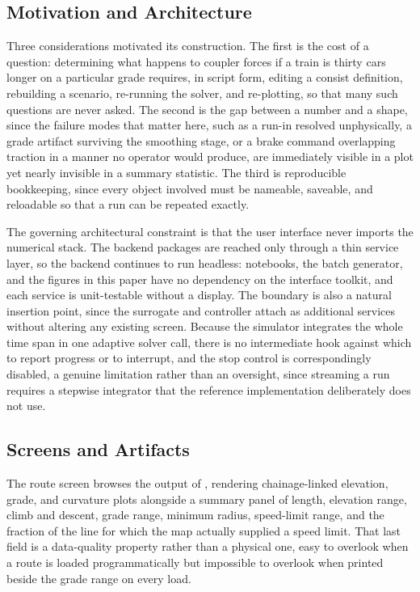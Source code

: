 \documentclass[numbered]{trbunofficial}
\begin{document}
\subsection{Motivation and Architecture}

Three considerations motivated its construction. The first is the cost of a question: determining what happens to coupler forces if a train is thirty cars longer on a particular grade requires, in script form, editing a consist definition, rebuilding a scenario, re-running the solver, and re-plotting, so that many such questions are never asked. The second is the gap between a number and a shape, since the failure modes that matter here, such as a run-in resolved unphysically, a grade artifact surviving the smoothing stage, or a brake command overlapping traction in a manner no operator would produce, are immediately visible in a plot yet nearly invisible in a summary statistic. The third is reproducible bookkeeping, since every object involved must be nameable, saveable, and reloadable so that a run can be repeated exactly.

The governing architectural constraint is that the user interface never imports the numerical stack. The backend packages are reached only through a thin service layer, so the backend continues to run headless: notebooks, the batch generator, and the figures in this paper have no dependency on the interface toolkit, and each service is unit-testable without a display. The boundary is also a natural insertion point, since the surrogate and controller attach as additional services without altering any existing screen. Because the simulator integrates the whole time span in one adaptive solver call, there is no intermediate hook against which to report progress or to interrupt, and the stop control is correspondingly disabled, a genuine limitation rather than an oversight, since streaming a run requires a stepwise integrator that the reference implementation deliberately does not use.

\subsection{Screens and Artifacts}

The route screen browses the output of , rendering chainage-linked elevation, grade, and curvature plots alongside a summary panel of length, elevation range, climb and descent, grade range, minimum radius, speed-limit range, and the fraction of the line for which the map actually supplied a speed limit. That last field is a data-quality property rather than a physical one, easy to overlook when a route is loaded programmatically but impossible to overlook when printed beside the grade range on every load.
\end{document}
